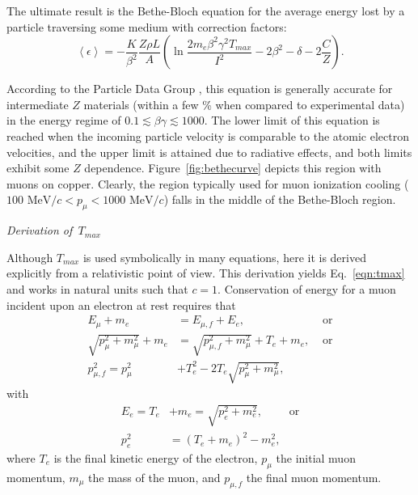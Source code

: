 The ultimate result is the Bethe-Bloch equation for the average energy lost by a particle traversing some medium with correction factors:
\begin{equation}\label{eqn:bethebloch}
\left< \epsilon \right> = -\frac{K}{\beta^2}\frac{Z\rho L}{A}\left(\ln{\frac{2m_e \beta ^2 \gamma ^2 T_{max}}{I^2}}-2\beta^2-\delta-2\frac{C}{Z}\right).
\end{equation}

According to the Particle Data Group \cite{PDG}, this equation is generally accurate for intermediate $Z$ materials (within a few \% when compared to experimental data) in the energy regime of $0.1 \lesssim \beta \gamma \lesssim 1000$. The lower limit of this equation is reached when the incoming particle velocity is comparable to the atomic electron velocities, and the upper limit is attained due to radiative effects, and both limits exhibit some $Z$ dependence. Figure~\ref{fig:bethecurve} depicts this region with muons on copper. Clearly, the region typically used for muon ionization cooling ($100 \text{ MeV/}c < p_\mu < 1000 \text{ MeV/}c$) falls in the middle of the Bethe-Bloch region.

\vspace{24pt}
\newpage %
\noindent \textit{\large{Derivation of $\,T_{max}$}}
\vspace{12pt}

Although $T_{max}$ is used symbolically in many equations, here it is derived explicitly from a relativistic point of view. This derivation yields Eq.~\eqref{eqn:tmax} and works in natural units such that $c=1$. Conservation of energy for a muon incident upon an electron at rest requires that 
\begin{align}
E_\mu+m_e&=E_{\mu,f}+E_e,&\text{ or} \nonumber\\
\sqrt{p_\mu ^2+m_\mu ^2}+m_e &= \sqrt{p_{\mu,f}^2+m_\mu ^2}+T_e+m_e,&\text{ or} \nonumber \\
p_{\mu,f}^2 =p_\mu^2 &+T_e^2-2T_e\sqrt{p_\mu ^2 + m_\mu^2}, \label{eqn:TMaxEnergy1}
\end{align}
with
\begin{align}
E_e=T_e&+m_e = \sqrt{p_e ^2+m_e^2},\qquad\text{ or} \nonumber\\
p_e ^2&=(T_e+m_e)^2-m_e^2, \label{eqn:TMaxEnergy2}
\end{align}
where $T_e$ is the final kinetic energy of the electron, $p_\mu$ the initial muon momentum, $m_\mu$ the mass of the muon, and $p_{\mu,f}$ the final muon momentum. 

